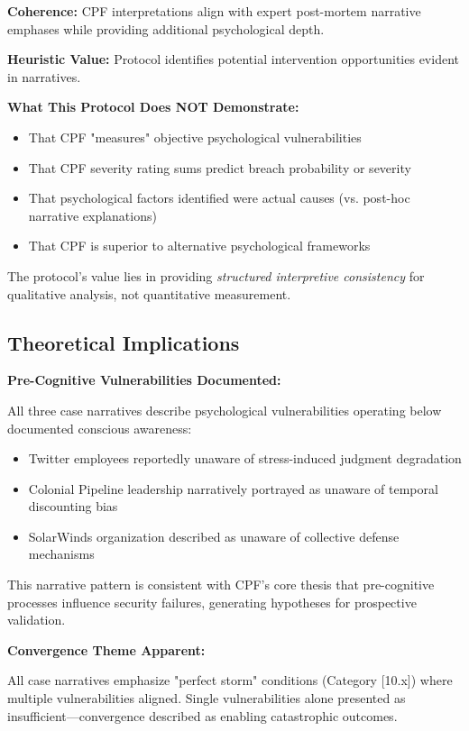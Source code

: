 \documentclass[11pt,a4paper]{article}
\begin{document}
\textbf{Coherence:} CPF interpretations align with expert post-mortem narrative emphases while providing additional psychological depth.

\textbf{Heuristic Value:} Protocol identifies potential intervention opportunities evident in narratives.

\textbf{What This Protocol Does NOT Demonstrate:}

\begin{itemize}
\item That CPF "measures" objective psychological vulnerabilities
\item That CPF severity rating sums predict breach probability or severity
\item That psychological factors identified were actual causes (vs. post-hoc narrative explanations)
\item That CPF is superior to alternative psychological frameworks
\end{itemize}

The protocol's value lies in providing \textit{structured interpretive consistency} for qualitative analysis, not quantitative measurement.

\subsection{Theoretical Implications}

\textbf{Pre-Cognitive Vulnerabilities Documented:}

All three case narratives describe psychological vulnerabilities operating below documented conscious awareness:
\begin{itemize}
\item Twitter employees reportedly unaware of stress-induced judgment degradation
\item Colonial Pipeline leadership narratively portrayed as unaware of temporal discounting bias
\item SolarWinds organization described as unaware of collective defense mechanisms
\end{itemize}

This narrative pattern is consistent with CPF's core thesis that pre-cognitive processes influence security failures, generating hypotheses for prospective validation.

\textbf{Convergence Theme Apparent:}

All case narratives emphasize "perfect storm" conditions (Category [10.x]) where multiple vulnerabilities aligned. Single vulnerabilities alone presented as insufficient—convergence described as enabling catastrophic outcomes.
\end{document}
